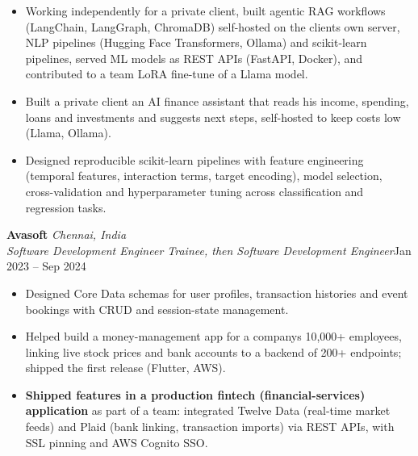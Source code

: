 \documentclass[a4paper,11pt]{article}
\newcommand{\role}[4]{%
  \textbf{#1}{\color{muted}\,\textperiodcentered\,\textit{#2}}\\
  \textit{#4}\hfill{\color{muted}#3}\par}
\newcommand{\gap}{\vspace{5pt}}
\newcommand{\num}[1]{\textbf{#1}}   %
\begin{document}
\begin{itemize}
  \item Working independently for a private client, built agentic RAG workflows (LangChain, LangGraph, ChromaDB) self-hosted on the client\textquotesingle{}s own server, NLP pipelines (Hugging Face Transformers, Ollama) and scikit-learn pipelines, served ML models as REST APIs (FastAPI, Docker), and contributed to a team LoRA fine-tune of a Llama model.
  \item Built a private client an AI finance assistant that reads his income, spending, loans and investments and suggests next steps, self-hosted to keep costs low (Llama, Ollama).
  \item Designed reproducible scikit-learn pipelines with feature engineering (temporal features, interaction terms, target encoding), model selection, cross-validation and hyperparameter tuning across classification and regression tasks.
\end{itemize}
\gap
{}
\role{Avasoft}{Chennai, India}{Jan 2023 – Sep 2024}{Software Development Engineer Trainee, then Software Development Engineer}
\begin{itemize}
  \item Designed Core Data schemas for user profiles, transaction histories and event bookings with CRUD and session-state management.
  \item Helped build a money-management app for a company\textquotesingle{}s 10,000+ employees, linking live stock prices and bank accounts to a backend of 200+ endpoints; shipped the first release (Flutter, AWS).
  \item \num{Shipped features in a production fintech (financial-services) application} as part of a team: integrated Twelve Data (real-time market feeds) and Plaid (bank linking, transaction imports) via REST APIs, with SSL pinning and AWS Cognito SSO.
\end{itemize}
\end{document}
